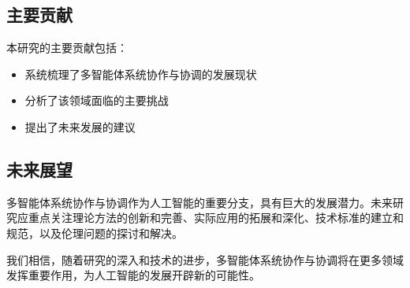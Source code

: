 \documentclass[12pt]{article}
\begin{document}
\subsection{主要贡献}
本研究的主要贡献包括：
\begin{itemize}
    \item 系统梳理了多智能体系统协作与协调的发展现状
    \item 分析了该领域面临的主要挑战
    \item 提出了未来发展的建议
\end{itemize}

\subsection{未来展望}
多智能体系统协作与协调作为人工智能的重要分支，具有巨大的发展潜力。未来研究应重点关注理论方法的创新和完善、实际应用的拓展和深化、技术标准的建立和规范，以及伦理问题的探讨和解决。

我们相信，随着研究的深入和技术的进步，多智能体系统协作与协调将在更多领域发挥重要作用，为人工智能的发展开辟新的可能性。



\end{document}
